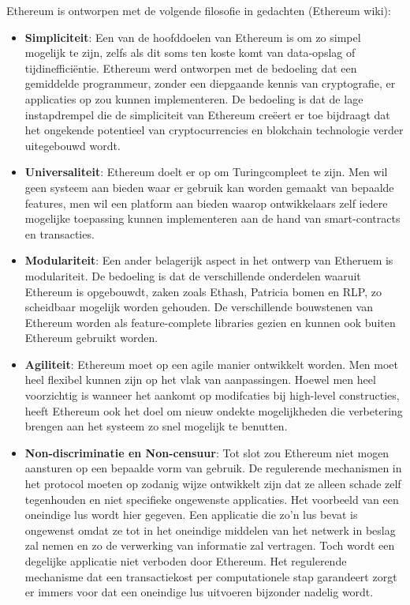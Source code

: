 			Ethereum is ontworpen met de volgende filosofie in gedachten (Ethereum wiki):
			\begin{itemize}
				\item \textbf{Simpliciteit}: 
				Een van de hoofddoelen van Ethereum is om zo simpel mogelijk te zijn, zelfs als dit soms ten koste komt van data-opslag of tijdinefficiëntie. Ethereum werd ontworpen met de bedoeling dat een gemiddelde programmeur, zonder een diepgaande kennis van cryptografie, er applicaties op zou kunnen implementeren. De bedoeling is dat de lage instapdrempel die de simpliciteit van Ethereum creëert er toe bijdraagt dat het ongekende potentieel van cryptocurrencies en blokchain technologie verder uitegebouwd wordt.
				\item \textbf{Universaliteit}: Ethereum doelt er op om Turingcompleet te zijn. Men wil  geen systeem aan bieden waar er gebruik kan worden gemaakt van bepaalde features, men wil een platform aan bieden waarop ontwikkelaars zelf iedere mogelijke toepassing kunnen implementeren aan de hand van smart-contracts en transacties.
				\item \textbf{Modulariteit}: 
				Een ander belagerijk aspect in het ontwerp van Etheruem is modulariteit. De bedoeling is dat de verschillende onderdelen waaruit Ethereum is opgebouwdt, zaken zoals Ethash, Patricia bomen en RLP, zo scheidbaar mogelijk worden gehouden. De verschillende bouwstenen van Ethereum worden als feature-complete libraries gezien en kunnen ook buiten Ethereum gebruikt worden.
				\item \textbf{Agiliteit}: 
				Ethereum moet op een agile manier ontwikkelt worden. Men moet heel flexibel kunnen zijn op het vlak van aanpassingen. Hoewel men heel voorzichtig is wanneer het aankomt op modifcaties bij high-level constructies, heeft Ethereum ook het doel om nieuw ondekte mogelijkheden die verbetering brengen aan het systeem zo snel mogelijk te benutten.
				\item \textbf{Non-discriminatie en Non-censuur}: 
				Tot slot zou Ethereum niet mogen aansturen op een bepaalde vorm van gebruik. De regulerende mechanismen in het protocol moeten op zodanig wijze ontwikkelt zijn dat ze alleen schade zelf tegenhouden en niet specifieke ongewenste applicaties. Het voorbeeld van een oneindige lus wordt hier gegeven. Een applicatie die zo'n lus bevat is  ongewenst omdat ze tot in het oneindige middelen van het netwerk in beslag zal nemen en zo de verwerking van informatie zal vertragen. Toch wordt een degelijke applicatie niet verboden door Ethereum. Het regulerende mechanisme dat een transactiekost per computationele stap garandeert zorgt er immers voor dat een oneindige lus uitvoeren bijzonder nadelig wordt.
			\end{itemize}
